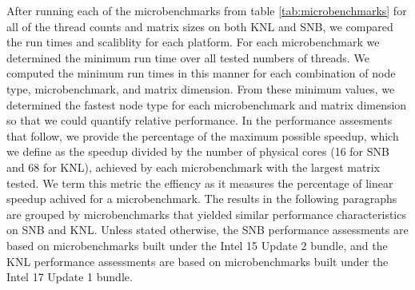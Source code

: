 After running each of the microbenchmarks from table \ref{tab:microbenchmarks} for all of
the thread counts and matrix sizes on both KNL and SNB, we compared the run times and
scaliblity for each platform. For each microbenchmark we determined the minimum run time
over all tested numbers of threads. We computed the minimum run times in this manner for
each combination of node type, microbenchmark, and matrix dimension. From these minimum
values, we determined the fastest node type for each microbenchmark and matrix dimension
so that we could quantify relative performance. In the performance assesments that follow,
we provide the percentage of the maximum possible speedup, which we define as the speedup
divided by the number of physical cores (16 for SNB and 68 for KNL), achieved by each
microbenchmark with the largest matrix tested. We term this metric the effiency as it
measures the percentage of linear speedup achived for a microbenchmark. The results in the
following paragraphs are grouped by microbenchmarks that yielded similar performance
characteristics on SNB and KNL. Unless stated otherwise, the SNB performance assessments
are based on microbenchmarks built under the Intel 15 Update 2 bundle, and the KNL
performance assessments are based on microbenchmarks built under the Intel 17 Update 1
bundle.


